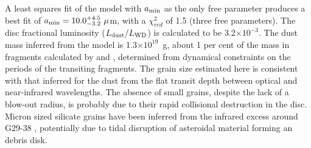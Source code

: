 \documentclass[useAMS,usenatbib]{mn2e}
\begin{document}
A least squares fit of the model with $a_{\rm min}$ as the only free parameter produces a best fit of $a_{\rm min} = 10.0^{+4.5}_{-3.2}~\mu$m, with a $\chi^{2}_{red}$ of 1.5 (three free parameters). The disc fractional luminosity ($L_{\rm dust}/L_{\rm WD}$) is calculated to be 3.2$\times10^{-3}$. The dust mass inferred from the model is 1.3$\times10^{19}$~g, about 1 per cent of the mass in fragments calculated by \cite{2015Natur.526..546V} and \citet{2016MNRAS.tmp..406R}, determined from dynamical constraints on the periods of the transiting fragments. The grain size estimated here is consistent with that inferred for the dust from the flat transit depth between optical and near-infrared wavelengths. The absence of small grains, despite the lack of a blow-out radius, is probably due to their rapid collisional destruction in the disc. Micron sized silicate grains have been inferred from the infrared excess around G29-38 \citep[e.g.][]{2005ApJ...635L.161R,2009ApJ...693..697R,2009AJ....137.3191J}, potentially due to tidal disruption of asteroidal material forming an debris disk. 
\end{document}
